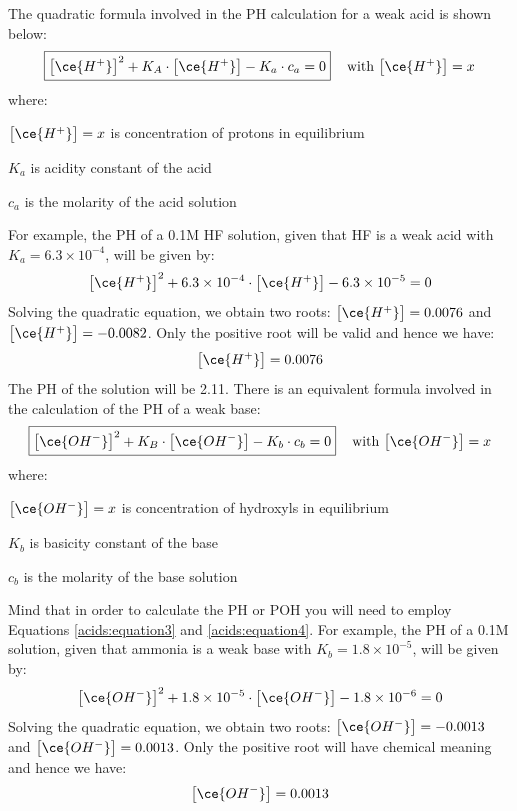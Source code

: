 \documentclass[main.tex]{subfiles}
\newcommand\chapterlabel{acids}
\begin{document}
\begin{description}
The quadratic formula involved in the PH calculation for a weak acid is shown below:
\begin{equation}
\boxed{ \big[ \ce{H^+} \big]^2 +K_A\cdot \big[ \ce{H^+} \big] -K_a\cdot c_a=0}\;\;\;    \text{            with  }\big[ \ce{H^+} \big]=x  \label{\chapterlabel:equation9}
\end{equation}
where:
\begin{where}
 \item $\big[ \ce{H^+} \big]=x$  is concentration of protons in equilibrium
 \item $K_a$   is acidity constant of the acid
 \item $c_a$   is the molarity of the acid solution
\end{where}
For example, the PH of a 0.1M HF solution, given that HF is a weak acid with $K_a=6.3 \times 10^{-4}$, will be given by:
\[ \big[ \ce{H^+} \big]^2 +6.3 \times 10^{-4}\cdot \big[ \ce{H^+} \big] -6.3 \times 10^{-5}=0 
\]
Solving the quadratic equation, we obtain two roots: $\big[ \ce{H^+} \big]= 0.0076$ and $\big[ \ce{H^+} \big]= -0.0082 $. Only the positive root will be valid and hence we have:
\[ \big[ \ce{H^+} \big]= 0.0076\]
The PH of the solution will be 2.11.  There is an equivalent formula involved in the calculation of the PH of a weak base: 
\begin{equation}
\boxed{ \big[ \ce{OH^-} \big]^2 +K_B\cdot \big[ \ce{OH^-} \big] -K_b\cdot c_b=0}\;\;\; \text{            with  }\big[ \ce{OH^-} \big]=x \label{\chapterlabel:equation10}
\end{equation}
where:
\begin{where}
 \item $\big[ \ce{OH^-} \big]=x$  is concentration of hydroxyls in equilibrium
  \item $K_b$   is basicity constant of the base
 \item $c_b$   is the molarity of the base solution
\end{where}
Mind that in order to calculate the PH or POH you will need to employ Equations \ref{\chapterlabel:equation3} and \ref{\chapterlabel:equation4}. For example, the PH of a 0.1M  solution, given that ammonia is a weak base with $K_b=1.8 \times 10^{-5}$, will be given by:
\[ \big[ \ce{OH^-} \big]^2 +1.8 \times 10^{-5}\cdot \big[ \ce{OH^-} \big] -1.8 \times 10^{-6}=0 
\]
Solving the quadratic equation, we obtain two roots: 
$ \big[ \ce{OH^-} \big]= -0.0013$ and $\big[ \ce{OH^-} \big]= 0.0013 $. Only the positive root will have chemical meaning and hence we have:
\[ \big[ \ce{OH^-} \big]= 0.0013\]

\end{description}
\end{document}
